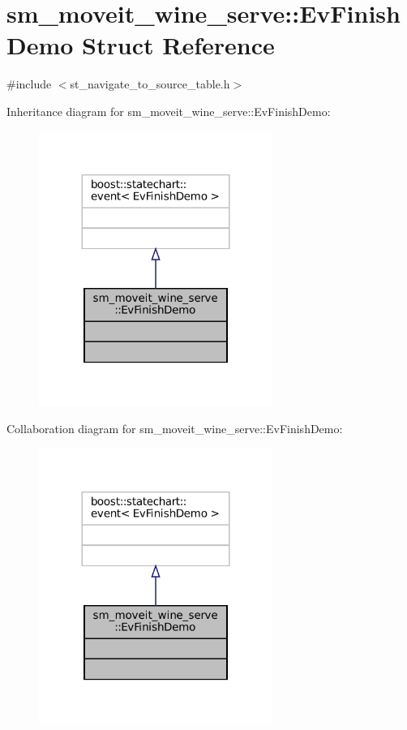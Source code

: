 \hypertarget{structsm__moveit__wine__serve_1_1EvFinishDemo}{}\section{sm\+\_\+moveit\+\_\+wine\+\_\+serve\+:\+:Ev\+Finish\+Demo Struct Reference}
\label{structsm__moveit__wine__serve_1_1EvFinishDemo}


{\ttfamily \#include $<$st\+\_\+navigate\+\_\+to\+\_\+source\+\_\+table.\+h$>$}



Inheritance diagram for sm\+\_\+moveit\+\_\+wine\+\_\+serve\+:\+:Ev\+Finish\+Demo\+:
\nopagebreak
\begin{figure}[H]
\begin{center}
\leavevmode
\includegraphics[width=216pt]{structsm__moveit__wine__serve_1_1EvFinishDemo__inherit__graph}
\end{center}
\end{figure}


Collaboration diagram for sm\+\_\+moveit\+\_\+wine\+\_\+serve\+:\+:Ev\+Finish\+Demo\+:
\nopagebreak
\begin{figure}[H]
\begin{center}
\leavevmode
\includegraphics[width=216pt]{structsm__moveit__wine__serve_1_1EvFinishDemo__coll__graph}
\end{center}
\end{figure}


